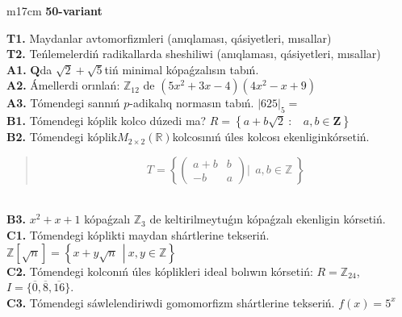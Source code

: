 \documentclass{article}
\begin{document}
\begin{tabular}{m{17cm}}
\textbf{50-variant}
\newline

\textbf{T1.} Maydanlar avtomorfizmleri (anıqlaması, qásiyetleri, mısallar) \\
\textbf{T2.} Teńlemelerdiń radikallarda sheshiliwi (anıqlaması, qásiyetleri, mısallar) \\
\textbf{A1.} \(\mathbf{Q}\)da \(\sqrt{2} + \sqrt{5}\)tiń minimal kópaǵzalısın tabıń. \\
\textbf{A2.} Ámellerdi orınlań: \(\mathbb{Z}_{12}\) de \(\left( 5x^{2} + 3x - 4 \right)\left( 4x^{2} - x + 9 \right)\) \\
\textbf{A3.} Tómendegi sannıń \(p\)-adikalıq normasın tabıń. \(|625|_{5} =\) \\
\textbf{B1.} Tómendegi kóplik kolco dúzedi ma? \(R = \left\{ a + b\sqrt{2}\ :\ \ \ \ a,b \in \mathbf{Z} \right\}\) \\
\textbf{B2.} Tómendegi kóplik\(M_{2 \times 2}\left( \mathbb{R} \right)\)kolcosınıń úles kolcosı ekenliginkórsetiń.
\begin{quote}
\[T = \left\{ \begin{pmatrix}
a + b & b \\
 - b & a
\end{pmatrix}\left| \ \ a,b\mathbb{\in Z} \right.\  \right\}\]
\end{quote} \\
\textbf{B3.} \(x^{2} + x + 1\) kópaǵzalı \(\mathbb{Z}_{3}\) de keltirilmeytuǵın kópaǵzalı ekenligin kórsetiń. \\
\textbf{C1.} Tómendegi kóplikti maydan shártlerine tekseriń. \(\mathbb{Z}\left\lbrack \sqrt{n} \right\rbrack = \left\{ x + y\sqrt{n}\ \ \left| \right.\ x,y \in \mathbb{Z} \right\}\) \\
\textbf{C2.} Tómendegi kolconıń úles kóplikleri ideal bolıwın kórsetiń:
\(R = \mathbb{Z}_{24}\), \(I = \{\overline{0},\overline{8},\overline{16}\}\). \\
\textbf{C3.} Tómendegi sáwlelendiriwdi gomomorfizm shártlerine tekseriń. \(f(x) = 5^{x}\) \\

\end{tabular}
\vspace{1cm}
\end{document}
